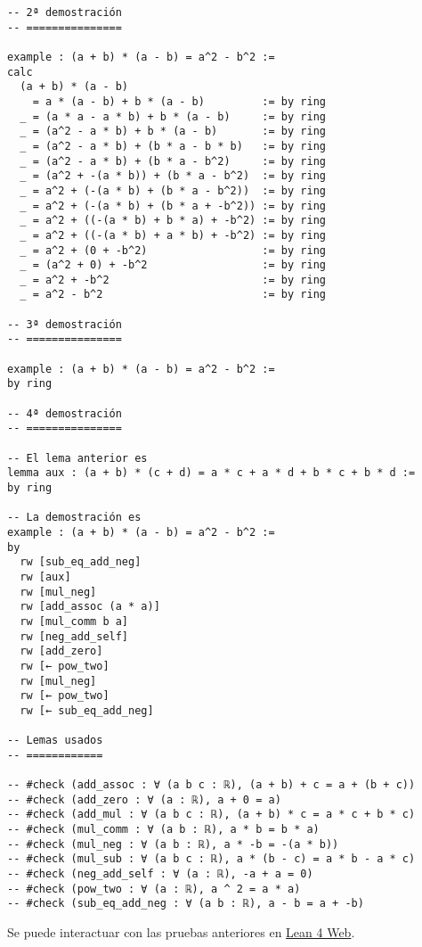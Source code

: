 \begin{verbatim}
-- 2ª demostración
-- ===============

example : (a + b) * (a - b) = a^2 - b^2 :=
calc
  (a + b) * (a - b)
    = a * (a - b) + b * (a - b)         := by ring
  _ = (a * a - a * b) + b * (a - b)     := by ring
  _ = (a^2 - a * b) + b * (a - b)       := by ring
  _ = (a^2 - a * b) + (b * a - b * b)   := by ring
  _ = (a^2 - a * b) + (b * a - b^2)     := by ring
  _ = (a^2 + -(a * b)) + (b * a - b^2)  := by ring
  _ = a^2 + (-(a * b) + (b * a - b^2))  := by ring
  _ = a^2 + (-(a * b) + (b * a + -b^2)) := by ring
  _ = a^2 + ((-(a * b) + b * a) + -b^2) := by ring
  _ = a^2 + ((-(a * b) + a * b) + -b^2) := by ring
  _ = a^2 + (0 + -b^2)                  := by ring
  _ = (a^2 + 0) + -b^2                  := by ring
  _ = a^2 + -b^2                        := by ring
  _ = a^2 - b^2                         := by ring

-- 3ª demostración
-- ===============

example : (a + b) * (a - b) = a^2 - b^2 :=
by ring

-- 4ª demostración
-- ===============

-- El lema anterior es
lemma aux : (a + b) * (c + d) = a * c + a * d + b * c + b * d :=
by ring

-- La demostración es
example : (a + b) * (a - b) = a^2 - b^2 :=
by
  rw [sub_eq_add_neg]
  rw [aux]
  rw [mul_neg]
  rw [add_assoc (a * a)]
  rw [mul_comm b a]
  rw [neg_add_self]
  rw [add_zero]
  rw [← pow_two]
  rw [mul_neg]
  rw [← pow_two]
  rw [← sub_eq_add_neg]

-- Lemas usados
-- ============

-- #check (add_assoc : ∀ (a b c : ℝ), (a + b) + c = a + (b + c))
-- #check (add_zero : ∀ (a : ℝ), a + 0 = a)
-- #check (add_mul : ∀ (a b c : ℝ), (a + b) * c = a * c + b * c)
-- #check (mul_comm : ∀ (a b : ℝ), a * b = b * a)
-- #check (mul_neg : ∀ (a b : ℝ), a * -b = -(a * b))
-- #check (mul_sub : ∀ (a b c : ℝ), a * (b - c) = a * b - a * c)
-- #check (neg_add_self : ∀ (a : ℝ), -a + a = 0)
-- #check (pow_two : ∀ (a : ℝ), a ^ 2 = a * a)
-- #check (sub_eq_add_neg : ∀ (a b : ℝ), a - b = a + -b)
\end{verbatim}
Se puede interactuar con las pruebas anteriores en \href{https://lean.math.hhu.de/\#url=https://raw.githubusercontent.com/jaalonso/Calculemus2/main/src/(a+b)(a-b)\_eq\_aa-bb.lean}{Lean 4 Web}.

